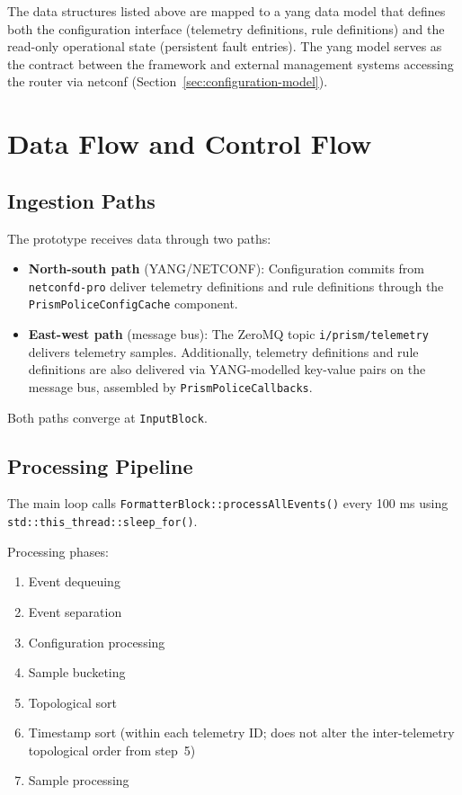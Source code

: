 The data structures listed above are mapped to a \gls{yang} data model that defines both the configuration interface (telemetry definitions, rule definitions) and the read-only operational state (persistent fault entries). The \gls{yang} model serves as the contract between the framework and external management systems accessing the router via \gls{netconf} (Section~\ref{sec:configuration-model}).

\section{Data Flow and Control Flow}\label{sec:impl-data-flow}

\subsection{Ingestion Paths}\label{sec:ingestion-paths}

The prototype receives data through two paths:

\begin{itemize}
\item \textbf{North-south path} (YANG/NETCONF): Configuration commits from \texttt{netconfd-pro} deliver telemetry definitions and rule definitions through the \texttt{PrismPoliceConfigCache} component.
\item \textbf{East-west path} (message bus): The ZeroMQ topic \texttt{i/prism/telemetry} delivers telemetry samples. Additionally, telemetry definitions and rule definitions are also delivered via YANG-modelled key-value pairs on the message bus, assembled by \texttt{PrismPoliceCallbacks}.
\end{itemize}

Both paths converge at \texttt{InputBlock}.

\subsection{Processing Pipeline}

The main loop calls \texttt{FormatterBlock::processAllEvents()} every 100 ms using \texttt{std::this\_thread::sleep\_for()}.

Processing phases:

\begin{enumerate}
\item Event dequeuing
\item Event separation
\item Configuration processing
\item Sample bucketing
\item Topological sort
\item Timestamp sort (within each telemetry ID; does not alter the inter-telemetry topological order from step~5)
\item Sample processing
\end{enumerate}


